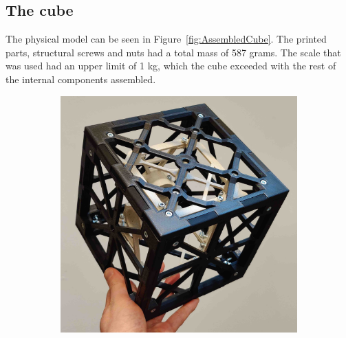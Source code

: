 \subsection{The cube}
The physical model can be seen in Figure~\ref{fig:AssembledCube}. The printed parts, structural screws and nuts had a total mass of 587 grams. The scale that was used had an upper limit of 1 kg, which the cube exceeded with the rest of the internal components assembled.

\begin{figure}[H]
    \centering
    \begin{subfigure}[h]{0.2\textwidth}
        \centering
        \includegraphics[width=\textwidth]{figures/CubeNoComponents.jpg}
        \label{fig:cubeNoComp}
    \end{subfigure}
    \begin{subfigure}[h]{0.2\textwidth}
        \centering

\end{subfigure}
\end{figure}
